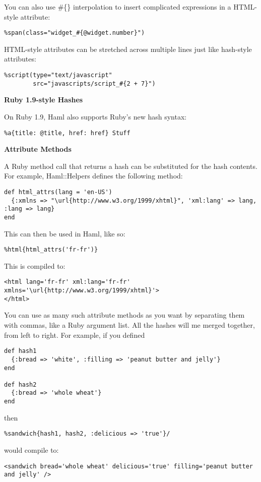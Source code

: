 \documentclass[10pt]{article}
\begin{document}
 You can also use \#\{\} interpolation to insert complicated expressions in a HTML-style attribute:
\begin{verbatim}
%span(class="widget_#{@widget.number}")
\end{verbatim}


 HTML-style attributes can be stretched across multiple lines just like hash-style attributes:
\begin{verbatim}
%script(type="text/javascript"
        src="javascripts/script_#{2 + 7}")
\end{verbatim}
\textbf{Ruby 1.9-style Hashes}


 On Ruby 1.9, Haml also supports Ruby’s new hash syntax:
\begin{verbatim}
%a{title: @title, href: href} Stuff
\end{verbatim}
\textbf{Attribute Methods}


 A Ruby method call that returns a hash can be substituted for the hash contents. For example, Haml::Helpers defines the following method:
\begin{verbatim}
def html_attrs(lang = 'en-US')
  {:xmlns => "\url{http://www.w3.org/1999/xhtml}", 'xml:lang' => lang, :lang => lang}
end
\end{verbatim}


 This can then be used in Haml, like so:
\begin{verbatim}
%html{html_attrs('fr-fr')}
\end{verbatim}


 This is compiled to:
\begin{verbatim}
<html lang='fr-fr' xml:lang='fr-fr' xmlns='\url{http://www.w3.org/1999/xhtml}'>
</html>
\end{verbatim}


 You can use as many such attribute methods as you want by separating them with commas, like a Ruby argument list. All the hashes will me merged together, from left to right. For example, if you defined
\begin{verbatim}
def hash1
  {:bread => 'white', :filling => 'peanut butter and jelly'}
end

def hash2
  {:bread => 'whole wheat'}
end
\end{verbatim}


 then
\begin{verbatim}
%sandwich{hash1, hash2, :delicious => 'true'}/
\end{verbatim}


 would compile to:
\begin{verbatim}
<sandwich bread='whole wheat' delicious='true' filling='peanut butter and jelly' />
\end{verbatim}
\end{document}
